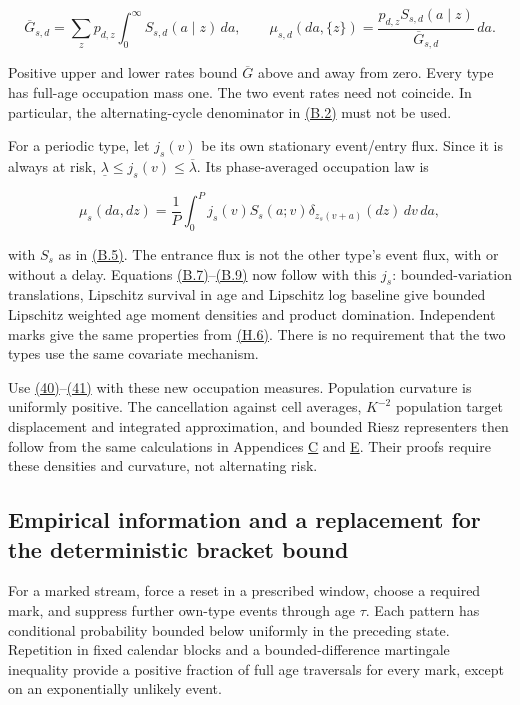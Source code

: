 \documentclass[11pt]{article}
\begin{document}
\begin{equation*}
\overline G_{s,d}=\sum_zp_{d,z}\int_0^\infty S_{s,d}(a\mid z)\,da,\qquad
\mu_{s,d}(da,\{z\})=
 \frac{p_{d,z}S_{s,d}(a\mid z)}{\overline G_{s,d}}\,da .
\tag{H.6}\label{eq:H.6}
\end{equation*}

Positive upper and lower rates bound \(\overline G\) above and away from zero. Every type has full-age occupation mass one. The two event rates need not coincide. In particular, the alternating-cycle denominator in \hyperref[eq:B.2]{(B.2)} must not be used.

For a periodic type, let \(j_s(v)\) be its own stationary event/entry flux. Since it is always at risk,
\(\underline\lambda\leq j_s(v)\leq\overline\lambda\).
Its phase-averaged occupation law is

\begin{equation*}
\mu_s(da,dz)=\frac1P\int_0^P j_s(v)S_s(a;v)
 \delta_{z_s(v+a)}(dz)\,dv\,da ,
\tag{H.7}\label{eq:H.7}
\end{equation*}

with \(S_s\) as in \hyperref[eq:B.5]{(B.5)}. The entrance flux is not the other type's event flux, with or without a delay. Equations \hyperref[eq:B.7]{(B.7)}--\hyperref[eq:B.9]{(B.9)} now follow with this \(j_s\): bounded-variation translations, Lipschitz survival in age and Lipschitz log baseline give bounded Lipschitz weighted age moment densities and product domination. Independent marks give the same properties from \hyperref[eq:H.6]{(H.6)}. There is no requirement that the two types use the same covariate mechanism.

Use \hyperref[eq:40]{(40)}--\hyperref[eq:41]{(41)} with these new occupation measures. Population curvature is uniformly positive. The cancellation against cell averages, \(K^{-2}\) population target displacement and integrated approximation, and bounded Riesz representers then follow from the same calculations in Appendices \hyperref[sec:C]{C} and \hyperref[sec:E]{E}. Their proofs require these densities and curvature, not alternating risk.

\subsection{Empirical information and a replacement for the deterministic bracket bound}\label{sec:H.4}

For a marked stream, force a reset in a prescribed window, choose a required mark, and suppress further own-type events through age \(\tau\). Each pattern has conditional probability bounded below uniformly in the preceding state. Repetition in fixed calendar blocks and a bounded-difference martingale inequality provide a positive fraction of full age traversals for every mark, except on an exponentially unlikely event.
\end{document}
